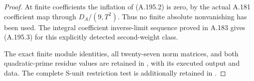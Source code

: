 \begin{proof}
At finite coefficients the inflation of (A.195.2) is
zero, by the actual A.181 coefficient map through
\(D_A/(9,T^2)\).  Thus no finite absolute nonvanishing
has been used.  The integral coefficient inverse-limit
sequence proved in A.183 gives (A.195.3) for this
explicitly detected second-weight class.

The exact finite module identities, all twenty-seven norm
matrices, and both quadratic-prime residue values are retained
in ,
with its executed output and data.  The complete S-unit
restriction test is additionally retained in
.
\end{proof}
